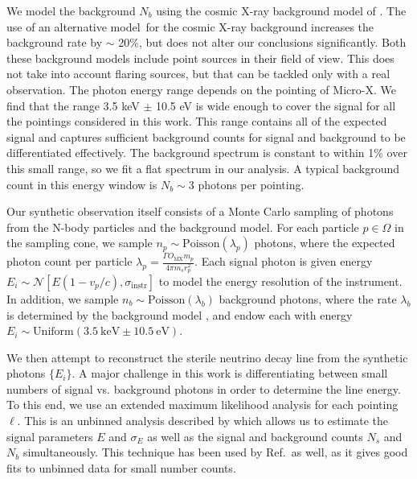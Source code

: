 \documentclass[aps,prd,10pt,twocolumn,superscriptaddress,showpacs]{revtex4-1}
\newcommand{\units}[1]{~\mathrm{#1}}
\begin{document}
We model the background $N_b$ using the cosmic X-ray background model of \cite{Ajello:2008xb}.  The
use of an alternative model\,\cite{2009A&A...493..501M} for the cosmic X-ray background increases the background rate by $\sim$ 20\%, but does not alter our
conclusions significantly.  Both these background models include point sources in their field of view.  This does not take into account flaring sources, but that can be tackled only with a real observation.  The photon energy range depends on the pointing of Micro-X.  We find that the range 3.5 keV $\pm$ 10.5 eV is wide enough to cover the signal for all the pointings considered in this work.
 This range contains all of the expected signal and captures
sufficient background counts for signal and background to be differentiated effectively. The
background spectrum is constant to within 1\% over this small range, so we fit a flat spectrum in
our analysis. A typical background count in this energy window is $N_b \sim 3$ photons per pointing.

Our synthetic observation itself consists of a Monte Carlo sampling of photons from the N-body particles
and the background model. For each particle $p \in \Omega$ in the sampling cone, we sample $n_p \sim
\mathrm{Poisson}(\lambda_p)$ photons, where the expected photon count per particle
$\lambda_p=\frac{\Gamma O_\mathrm{MX}m_p}{4\pi m_s r_p^2}$.
Each signal photon is given energy $E_i \sim \mathcal{N}[E(1-v_p/c),
\sigma_\mathrm{instr}]$ to model the energy resolution of the instrument. In
addition, we sample $n_b \sim \mathrm{Poisson}(\lambda_b)$ background photons, where the rate $\lambda_b$ is
determined by the background model \cite{Ajello:2008xb}, and endow each with energy
$E_i \sim \mathrm{Uniform}(3.5\units{keV}\pm10.5\units{eV})$. 

We then attempt to reconstruct the sterile neutrino decay line from the synthetic photons $\{E_i\}$.
A major challenge in this work is differentiating between small numbers of signal vs. background photons in
order to determine the line energy. To this end, we use an extended maximum likelihood analysis for
each pointing $\ell$.  This is an unbinned analysis described by \cite{barlow1990} which allows us to estimate
the signal parameters $E$ and $\sigma_E$ as well as the signal and background counts $N_s$
and $N_b$ simultaneously. This technique has been used by Ref.\,\cite{Figueroa-Feliciano:2015gwa} as well, as it gives
good fits to unbinned data for small number counts. 
\end{document}

